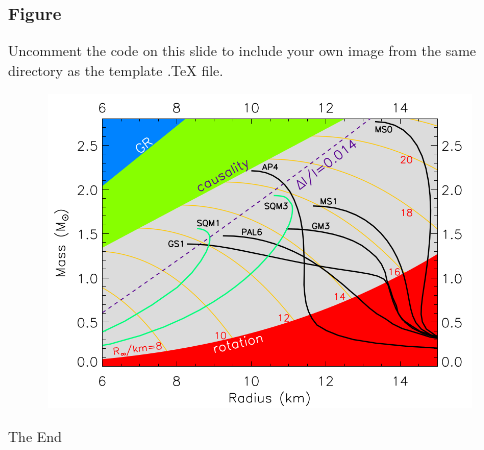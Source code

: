 \documentclass{beamer}
\begin{document}
\begin{frame}
\frametitle{Figure}
Uncomment the code on this slide to include your own image from the same directory as the template .TeX file.
\begin{figure}
\includegraphics[width=0.8\linewidth]{eos_mr.png}
\end{figure}
\end{frame}







\begin{frame}
\Huge{\centerline{The End}}
\end{frame}

\end{document}
